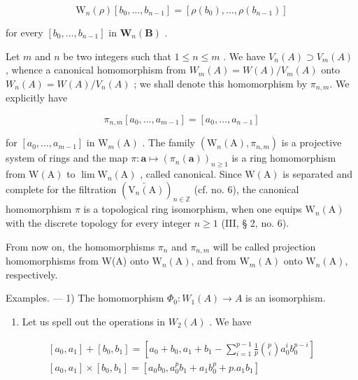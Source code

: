 \[
\mathrm{W} _ {n} (\rho) \left[ b _ {0},..., b _ {n - 1} \right] = \left[ \rho (b _ {0}),..., \rho (b _ {n - 1}) \right]\tag{43}
\]

for every \([b_0, \ldots, b_{n-1}]\) in \(\mathbf{W}_n(\mathbf{B})\) .

Let \(m\) and \(n\) be two integers such that \(1 \leqslant n \leqslant m\) . We have \(V_n(A) \supset V_m(A)\) , whence a canonical homomorphism from \(W_m(A) = W(A)/V_m(A)\) onto \(W_n(A) = W(A)/V_n(A)\) ; we shall denote this homomorphism by \(\pi_{n,m}\). We explicitly have

\[
\pi_ {n, m} [ a _ {0}, \dots , a _ {m - 1} ] = [ a _ {0}, \dots , a _ {n - 1} ]\tag{44}
\]

for \([a_0, \ldots, a_{m-1}]\) in \(\mathrm{W}_m(\mathrm{A})\) . The family \((\mathrm{W}_n(\mathrm{A}), \pi_{n,m})\) is a projective system of rings and the map \(\pi: \boldsymbol{a} \mapsto (\pi_n(\boldsymbol{a}))_{n \geqslant 1}\) is a ring homomorphism from \(\mathrm{W}(\mathrm{A})\) to \(\lim \mathrm{W}_n(\mathrm{A})\) , called canonical. Since \(\mathrm{W}(\mathrm{A})\) is separated and complete for the filtration \((\overleftarrow{\mathrm{V}_n(\mathrm{A})})_{n \in \mathbb{Z}}\) (cf. no. 6), the canonical homomorphism \(\pi\) is a topological ring isomorphism, when one equips \(\mathrm{W}_n(\mathrm{A})\) with the discrete topology for every integer \(n \geqslant 1\) (III, § 2, no. 6).

From now on, the homomorphisms \(\pi_{n}\) and \(\pi_{n,m}\) will be called projection homomorphisms from W(A) onto \(\mathrm{W}_{n}(\mathrm{A})\), and from \(\mathrm{W}_{m}(\mathrm{A})\) onto \(\mathrm{W}_{n}(\mathrm{A})\), respectively.

Examples. --- 1) The homomorphism \(\Phi_{0}:W_{1}(A)\to A\) is an isomorphism.

\begin{enumerate}
\def\labelenumi{\arabic{enumi})}
\setcounter{enumi}{1}
\tightlist
\item
  Let us spell out the operations in \(W_{2}(A)\) . We have
\end{enumerate}

\[
\begin{array}{l} \left[ a _ {0}, a _ {1} \right] + \left[ b _ {0}, b _ {1} \right] = \left[ a _ {0} + b _ {0}, a _ {1} + b _ {1} - \sum_ {i = 1} ^ {p - 1} \frac {1}{p} \binom {p} {i} a _ {0} ^ {i} b _ {0} ^ {p - i} \right] \\ \left[ a _ {0}, a _ {1} \right] \times \left[ b _ {0}, b _ {1} \right] = \left[ a _ {0} b _ {0}, a _ {0} ^ {p} b _ {1} + a _ {1} b _ {0} ^ {p} + p. a _ {1} b _ {1} \right] \end{array}
\]

